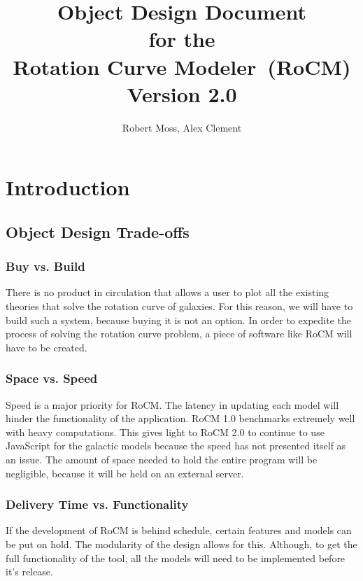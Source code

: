 \documentclass[titlepage]{article}
\def \RoCM {Rotation Curve Modeler}
\begin{document}
\title{
\textbf{
Object Design Document}
\protect\\
for the
\protect\\
\textbf{
\RoCM\ (RoCM)}
\protect\\
{\small Version 2.0}}

\author{Robert Moss, Alex Clement}
\maketitle

\newpage
\tableofcontents{} 
\newpage

\section{Introduction}

\subsection{Object Design Trade-offs}

\subsubsection{Buy vs. Build}
There is no product in circulation that allows a user to plot all the existing theories that solve the rotation curve of galaxies. For this reason, we will have to build such a system, because buying it is not an option. In order to expedite the process of solving the rotation curve problem, a piece of software like RoCM will have to be created.
	

\subsubsection{Space vs. Speed}
Speed is a major priority for RoCM. The latency in updating each model will hinder the functionality of the application. RoCM 1.0 benchmarks extremely well with heavy computations. This gives light to RoCM 2.0 to continue to use JavaScript for the galactic models because the speed has not presented itself as an issue. The amount of space needed to hold the entire program will be negligible, because it will be held on an external server.

\subsubsection{Delivery Time vs. Functionality}
If the development of RoCM is behind schedule, certain features and models can be put on hold. The modularity of the design allows for this. Although, to get the full functionality of the tool, all the models will need to be implemented before it's release.
\end{document}
